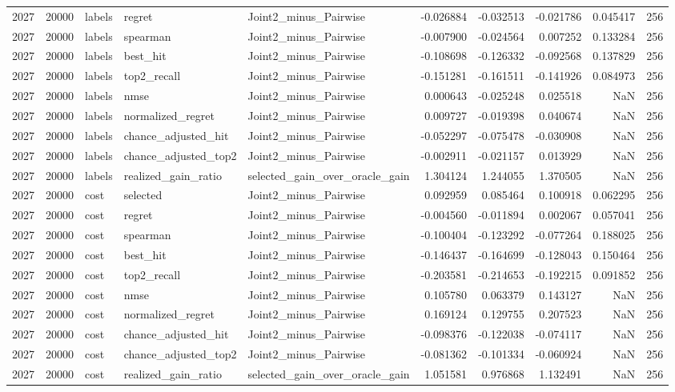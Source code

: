 \begin{tabular}{rrlllrrrrr}
2027 & 20000 & labels & regret & Joint2_minus_Pairwise & -0.026884 & -0.032513 & -0.021786 & 0.045417 & 256 \\
2027 & 20000 & labels & spearman & Joint2_minus_Pairwise & -0.007900 & -0.024564 & 0.007252 & 0.133284 & 256 \\
2027 & 20000 & labels & best_hit & Joint2_minus_Pairwise & -0.108698 & -0.126332 & -0.092568 & 0.137829 & 256 \\
2027 & 20000 & labels & top2_recall & Joint2_minus_Pairwise & -0.151281 & -0.161511 & -0.141926 & 0.084973 & 256 \\
2027 & 20000 & labels & nmse & Joint2_minus_Pairwise & 0.000643 & -0.025248 & 0.025518 & NaN & 256 \\
2027 & 20000 & labels & normalized_regret & Joint2_minus_Pairwise & 0.009727 & -0.019398 & 0.040674 & NaN & 256 \\
2027 & 20000 & labels & chance_adjusted_hit & Joint2_minus_Pairwise & -0.052297 & -0.075478 & -0.030908 & NaN & 256 \\
2027 & 20000 & labels & chance_adjusted_top2 & Joint2_minus_Pairwise & -0.002911 & -0.021157 & 0.013929 & NaN & 256 \\
2027 & 20000 & labels & realized_gain_ratio & selected_gain_over_oracle_gain & 1.304124 & 1.244055 & 1.370505 & NaN & 256 \\
2027 & 20000 & cost & selected & Joint2_minus_Pairwise & 0.092959 & 0.085464 & 0.100918 & 0.062295 & 256 \\
2027 & 20000 & cost & regret & Joint2_minus_Pairwise & -0.004560 & -0.011894 & 0.002067 & 0.057041 & 256 \\
2027 & 20000 & cost & spearman & Joint2_minus_Pairwise & -0.100404 & -0.123292 & -0.077264 & 0.188025 & 256 \\
2027 & 20000 & cost & best_hit & Joint2_minus_Pairwise & -0.146437 & -0.164699 & -0.128043 & 0.150464 & 256 \\
2027 & 20000 & cost & top2_recall & Joint2_minus_Pairwise & -0.203581 & -0.214653 & -0.192215 & 0.091852 & 256 \\
2027 & 20000 & cost & nmse & Joint2_minus_Pairwise & 0.105780 & 0.063379 & 0.143127 & NaN & 256 \\
2027 & 20000 & cost & normalized_regret & Joint2_minus_Pairwise & 0.169124 & 0.129755 & 0.207523 & NaN & 256 \\
2027 & 20000 & cost & chance_adjusted_hit & Joint2_minus_Pairwise & -0.098376 & -0.122038 & -0.074117 & NaN & 256 \\
2027 & 20000 & cost & chance_adjusted_top2 & Joint2_minus_Pairwise & -0.081362 & -0.101334 & -0.060924 & NaN & 256 \\
2027 & 20000 & cost & realized_gain_ratio & selected_gain_over_oracle_gain & 1.051581 & 0.976868 & 1.132491 & NaN & 256 \\
\bottomrule
\end{tabular}

